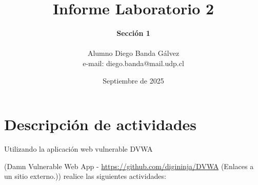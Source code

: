 \documentclass[letter,12pt]{article}
\begin{document}
%
   \title{\Huge{Informe Laboratorio 2}}

   \author{\textbf{Sección 1} \\  \\Alumno Diego Banda Gálvez \\ e-mail: diego.banda@mail.udp.cl}
          
   \date{Septiembre de 2025}

   \maketitle
   
   \tableofcontents
 
  \newpage
  

\section{Descripción de actividades}
Utilizando la aplicación web vulnerable DVWA

(Damn Vulnerable Web App - \href{https://github.com/digininja/DVWA}{https://github.com/digininja/DVWA} (Enlaces a un sitio externo.)) realice las siguientes actividades:
\end{document}
